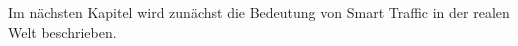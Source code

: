 Im nächsten Kapitel wird zunächst die Bedeutung von Smart Traffic in der realen Welt beschrieben.



\clearpage
